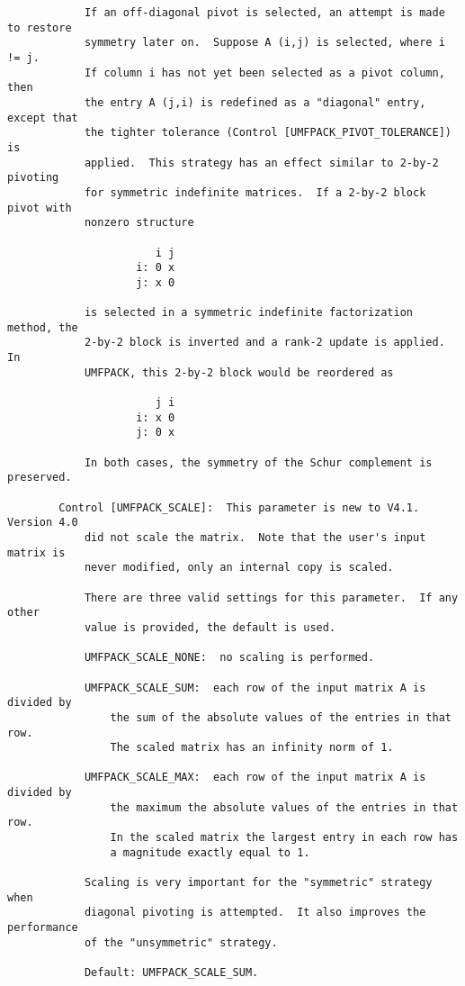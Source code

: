 \documentclass[11pt]{article}
\begin{document}
{\begin{verbatim}
            If an off-diagonal pivot is selected, an attempt is made to restore
            symmetry later on.  Suppose A (i,j) is selected, where i != j.
            If column i has not yet been selected as a pivot column, then
            the entry A (j,i) is redefined as a "diagonal" entry, except that
            the tighter tolerance (Control [UMFPACK_PIVOT_TOLERANCE]) is
            applied.  This strategy has an effect similar to 2-by-2 pivoting
            for symmetric indefinite matrices.  If a 2-by-2 block pivot with
            nonzero structure

                       i j
                    i: 0 x
                    j: x 0

            is selected in a symmetric indefinite factorization method, the
            2-by-2 block is inverted and a rank-2 update is applied.  In
            UMFPACK, this 2-by-2 block would be reordered as

                       j i
                    i: x 0
                    j: 0 x

            In both cases, the symmetry of the Schur complement is preserved.

        Control [UMFPACK_SCALE]:  This parameter is new to V4.1.  Version 4.0
            did not scale the matrix.  Note that the user's input matrix is
            never modified, only an internal copy is scaled.

            There are three valid settings for this parameter.  If any other
            value is provided, the default is used.

            UMFPACK_SCALE_NONE:  no scaling is performed.

            UMFPACK_SCALE_SUM:  each row of the input matrix A is divided by
                the sum of the absolute values of the entries in that row.
                The scaled matrix has an infinity norm of 1.

            UMFPACK_SCALE_MAX:  each row of the input matrix A is divided by
                the maximum the absolute values of the entries in that row.
                In the scaled matrix the largest entry in each row has
                a magnitude exactly equal to 1.

            Scaling is very important for the "symmetric" strategy when
            diagonal pivoting is attempted.  It also improves the performance
            of the "unsymmetric" strategy.

            Default: UMFPACK_SCALE_SUM.


\end{verbatim}}
\end{document}
